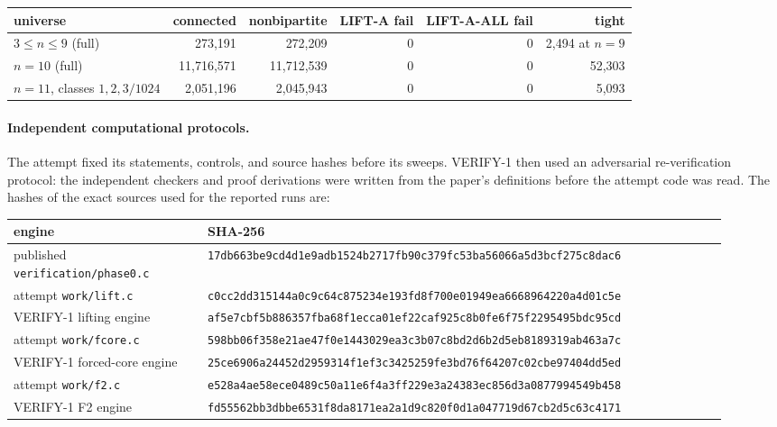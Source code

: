 \documentclass[11pt]{article}
\theoremstyle{plain}
\theoremstyle{definition}
\begin{document}
\begin{center}
\scriptsize
\begin{tabular}{l|r|r|r|r|r}
universe & connected & nonbipartite & LIFT-A fail & LIFT-A-ALL fail & tight\\
\hline
$3\le n\le9$ (full) & 273,191 & 272,209 & 0 & 0 & 2,494 at $n=9$\\
$n=10$ (full) & 11,716,571 & 11,712,539 & 0 & 0 & 52,303\\
$n=11$, classes $1,2,3/1024$ & 2,051,196 & 2,045,943 & 0 & 0 & 5,093
\end{tabular}
\end{center}

\paragraph{Independent computational protocols.} The attempt fixed its
statements, controls, and source hashes before its sweeps.  VERIFY-1 then used
an adversarial re-verification protocol: the independent checkers and proof
derivations were written from the paper's definitions before the attempt code
was read.  The hashes of the exact sources used for the reported runs are:

\begin{center}
\scriptsize
\begin{tabular}{p{0.25\linewidth}|p{0.67\linewidth}}
engine & SHA-256\\
\hline
published \texttt{verification/phase0.c} &
\texttt{17db663be9cd4d1e9adb1524b2717fb90c379fc53ba56066a5d3bcf275c8dac6}\\
attempt \texttt{work/lift.c} &
\texttt{c0cc2dd315144a0c9c64c875234e193fd8f700e01949ea6668964220a4d01c5e}\\
VERIFY-1 lifting engine &
\texttt{af5e7cbf5b886357fba68f1ecca01ef22caf925c8b0fe6f75f2295495bdc95cd}\\
attempt \texttt{work/fcore.c} &
\texttt{598bb06f358e21ae47f0e1443029ea3c3b07c8bd2d6b2d5eb8189319ab463a7c}\\
VERIFY-1 forced-core engine &
\texttt{25ce6906a24452d2959314f1ef3c3425259fe3bd76f64207c02cbe97404dd5ed}\\
attempt \texttt{work/f2.c} &
\texttt{e528a4ae58ece0489c50a11e6f4a3ff229e3a24383ec856d3a0877994549b458}\\
VERIFY-1 F2 engine &
\texttt{fd55562bb3dbbe6531f8da8171ea2a1d9c820f0d1a047719d67cb2d5c63c4171}
\end{tabular}
\end{center}
\end{document}
